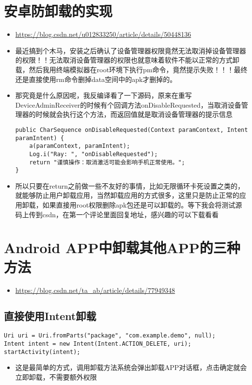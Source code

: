 \documentclass[9pt, b5paper]{article}
\begin{document}
\section{安卓防卸载的实现}
\label{sec-5}
\begin{itemize}
\item \url{https://blog.csdn.net/u012833250/article/details/50448136}
\item 最近搞到个木马，安装之后确认了设备管理器权限竟然无法取消掉设备管理器的权限！！无法取消设备管理器的权限也就意味着软件不能以正常的方式卸载，然后我用终端模拟器在root环境下执行pm命令，竟然提示失败！！！最终还是直接使用rm命令删掉data空间中的apk才删掉的。
\item 那究竟是什么原因呢，我反编译看了一下源码，原来在重写DeviceAdminReceiver的时候有个回调方法onDisableRequested，当取消设备管理器的时候就会执行这个方法，而返回值就是取消设备管理器的提示信息 
\begin{verbatim}
public CharSequence onDisableRequested(Context paramContext, Intent paramIntent) {
    a(paramContext, paramIntent);
    Log.i("Ray: ", "onDisableRequested");
    return "谨慎操作：取消激活可能会影响手机正常使用。";
}
\end{verbatim}
\item 所以只要在return之前做一些不友好的事情，比如无限循环卡死设置之类的，就能够防止用户卸载应用，当然卸载应用的方式很多，这里只是防止正常的应用卸载，如果直接用root权限删除apk包还是可以卸载的。等下我会将测试源码上传到csdn，在第一个评论里面回复地址，感兴趣的可以下载看看
\end{itemize}

\section{Android APP中卸载其他APP的三种方法}
\label{sec-6}
\begin{itemize}
\item \url{https://blog.csdn.net/ta_ab/article/details/77949348}
\end{itemize}
\subsection{直接使用Intent卸载}
\label{sec-6-1}
\begin{verbatim}
Uri uri = Uri.fromParts("package", "com.example.demo", null);
Intent intent = new Intent(Intent.ACTION_DELETE, uri);
startActivity(intent);
\end{verbatim}
\begin{itemize}
\item 这是最简单的方式，调用卸载方法系统会弹出卸载APP对话框，点击确定就会立即卸载，不需要额外权限
\end{itemize}
\end{document}
